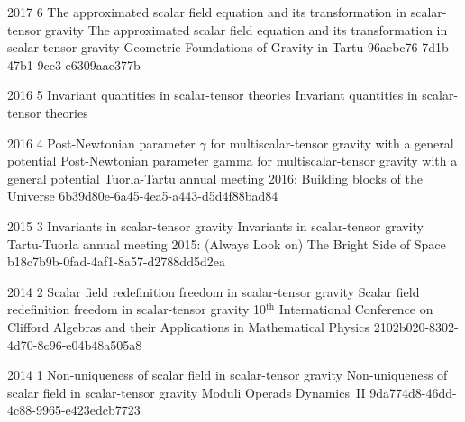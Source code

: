 
\lisaEttekanne%
	{2017}%
	{6}%
	{The approximated scalar field equation and its transformation in scalar-tensor \mbox{gravity}}%
	{The approximated scalar field equation and its transformation in scalar-tensor gravity}%
	{Geometric Foundations of Gravity in Tartu}%
	{%
	}%
	{96aebc76-7d1b-47b1-9cc3-e6309aae377b}%
	

\lisaEttekanne%
	{2016}%
	{5}%
	{Invariant quantities in scalar-tensor theories}%
	{Invariant quantities in scalar-tensor theories}%
	{%
	}%
	{%
	}%
	{}%


\lisaEttekanne%
	{2016}%
	{4}%
	{Post-Newtonian parameter $\gamma$ for multiscalar-tensor gravity with a general \mbox{potential}}%
	{Post-Newtonian parameter gamma for multiscalar-tensor gravity with a general potential}%
	{Tuorla-Tartu annual meeting 2016: Building blocks of the Universe}%
	{%
	}%
	{6b39d80e-6a45-4ea5-a443-d5d4f88bad84}%


\lisaEttekanne%
	{2015}%
	{3}%
	{Invariants in scalar-tensor gravity}%
	{Invariants in scalar-tensor gravity}%
	{Tartu-Tuorla annual meeting 2015: (Always Look on) The Bright Side of Space}%
	{%
	}%
	{b18c7b9b-0fad-4af1-8a57-d2788dd5d2ea}%


\lisaEttekanne%
	{2014}%
	{2}%
	{Scalar field redefinition freedom in scalar-tensor gravity}%
	{Scalar field redefinition freedom in scalar-tensor gravity}%
	{10$^{\text{th}}$ International \mbox{Conference} on Clifford Algebras and their Applications in Mathematical Physics}%
	{%
	}%
	{2102b020-8302-4d70-8c96-e04b48a505a8}%


\lisaEttekanne%
	{2014}%
	{1}%
	{Non-uniqueness of scalar field in scalar-tensor gravity}%
	{Non-uniqueness of scalar field in scalar-tensor gravity}%
	{Moduli Operads \mbox{Dynamics II}}%
	{%
	}%
	{9da774d8-46dd-4c88-9965-e423edcb7723}%